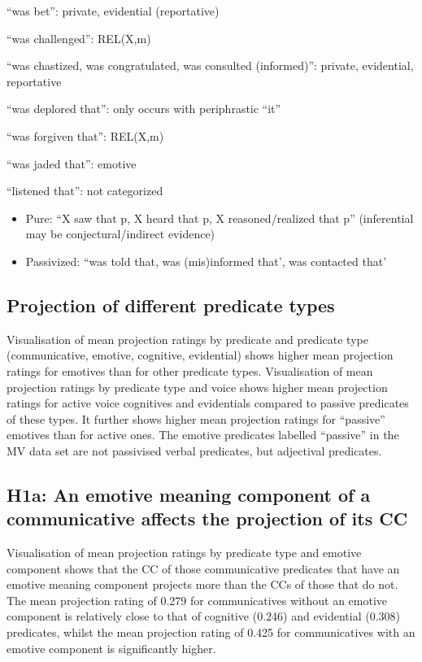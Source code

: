 \documentclass[11pt,fleqn]{article}
\newcommand{\6}{\mbox{$[\hspace*{-.6mm}[$}}
\newcommand{\9}{\mbox{$]\hspace*{-.6mm}]$}}
\begin{document}
\begin{itemize}
\begin{itemize}
``was bet'': private, evidential (reportative)

``was challenged'': REL(X,m)

``was chastized, was congratulated, was consulted (informed)'': private, evidential, reportative

``was deplored that'': only occurs with periphrastic ``it''

``was forgiven that'': REL(X,m)

``was jaded that'': emotive

``listened that'': not categorized

\begin{itemize}

\item Pure: ``X saw that p, X heard that p, X reasoned/realized that p'' (inferential may be conjectural/indirect evidence)

\item Passivized: ``was told that, was (mis)informed that', was contacted that'

\end{itemize}

\end{itemize}

\end{itemize}

\subsection{Projection of different predicate types}

Visualisation of mean projection ratings by predicate and predicate type (communicative, emotive, cognitive, evidential) shows higher mean projection ratings for emotives than for other predicate types. Visualisation of mean projection ratings by predicate type and voice shows higher mean projection ratings for active voice cognitives and evidentials compared to passive predicates of these types. It further shows higher mean projection ratings for ``passive'' emotives than for active ones. The emotive predicates labelled ``passive'' in the MV data set are not passivised verbal predicates, but adjectival predicates.

\subsection{H1a: An emotive meaning component of a communicative affects the projection of its CC}

Visualisation of mean projection ratings by predicate type and emotive component shows that the CC of those communicative predicates that have an emotive meaning component projects more than the CCs of those that do not. The mean projection rating of 0.279 for communicatives without an emotive component is relatively close to that of cognitive (0.246) and evidential (0.308) predicates, whilst the mean projection rating of 0.425 for communicatives with an emotive component is significantly higher. 
\end{document}
